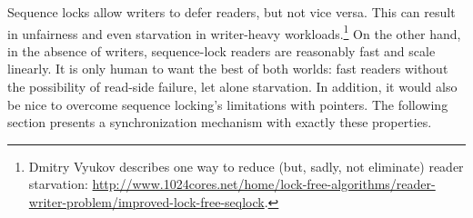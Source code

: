 Sequence locks allow writers to defer readers, but not vice versa.
This can result in unfairness and even starvation
in writer-heavy workloads.\footnote{
	Dmitry Vyukov describes one way to reduce (but, sadly, not eliminate)
	reader starvation:
	\url{http://www.1024cores.net/home/lock-free-algorithms/reader-writer-problem/improved-lock-free-seqlock}.}
On the other hand, in the absence of writers, sequence-lock readers are
reasonably fast and scale linearly.
It is only human to want the best of both worlds: fast readers without
the possibility of read-side failure, let alone starvation.
In addition, it would also be nice to overcome sequence locking's limitations
with pointers.
The following section presents a synchronization mechanism with exactly
these properties.
